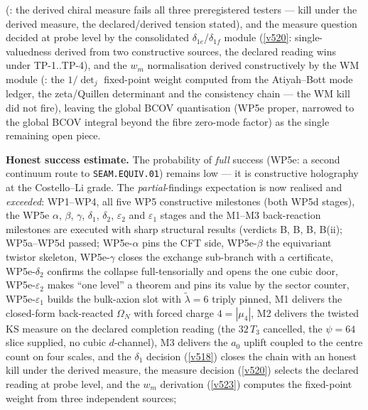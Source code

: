 (: the derived chiral measure fails all
three preregistered testers --- kill under the derived measure, the declared/derived tension
stated), and the measure question decided at probe level by the consolidated
$\delta_{1e}$/$\delta_{1f}$ module (\vref{v520}: single-valuedness derived from two
constructive sources, the declared reading wins under TP-1..TP-4), and the $w_m$
normalisation derived constructively by the WM module
(: the $1/\det_j$ fixed-point weight computed from
the Atiyah--Bott mode ledger, the zeta/Quillen determinant and the consistency chain --- the
WM kill did not fire), leaving the global
BCOV quantisation (WP5e proper, narrowed to the global BCOV integral beyond the fibre
zero-mode factor) as the single
remaining open piece.

\par\smallskip\noindent\textbf{Honest success estimate.} The probability of \emph{full} success
(WP5e: a second continuum route to \texttt{SEAM.EQUIV.01}) remains low --- it is constructive
holography at the Costello--Li grade. The \emph{partial}-findings expectation is now realised and
\emph{exceeded}: WP1--WP4, all five WP5 constructive milestones (both WP5d stages), the WP5e
$\alpha$, $\beta$, $\gamma$, $\delta_1$, $\delta_2$, $\varepsilon_2$ and $\varepsilon_1$ stages
and the
M1--M3 back-reaction milestones are
executed with sharp structural results (verdicts B, B, B, B(ii); WP5a--WP5d passed;
WP5e-$\alpha$ pins the CFT side, WP5e-$\beta$ the equivariant twistor skeleton, WP5e-$\gamma$
closes the exchange sub-branch with a certificate, WP5e-$\delta_2$ confirms the collapse
full-tensorially and opens the one cubic door, WP5e-$\varepsilon_2$ makes ``one level'' a
theorem and pins its value by the sector counter, WP5e-$\varepsilon_1$ builds the bulk-axion
slot with $\tilde\lambda=6$ triply pinned, M1 delivers the closed-form back-reacted
$\Omega_N$ with forced charge $4=|\mu_4|$, M2 delivers the twisted KS measure on the declared
completion reading (the $32\,T_3$ cancelled, the $\psi=64$ slice supplied, no cubic
$d$-channel), M3 delivers the $a_0$ uplift coupled to the centre count on four scales, and the
$\delta_1$ decision (\vref{v518}) closes the chain with an honest kill under the derived
measure, the measure decision (\vref{v520}) selects the declared reading at probe level, and
the $w_m$ derivation (\vref{v523}) computes the fixed-point weight from three independent
sources;
